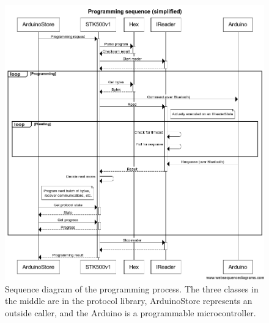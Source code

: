 	\begin{figure}[H]
	\hspace*{-1.0in}
	\includegraphics[scale=0.6]{images/Sequence_diagram.png}
	\caption[Sequence diagram for programming]{Sequence diagram of the programming process. The three classes in the middle are in the protocol library, ArduinoStore represents an outside caller, and the Arduino is a programmable microcontroller.}
	\label{fig:stk500_sequence_diagram}
	\end{figure}


